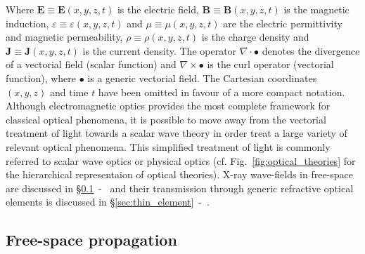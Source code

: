 \begin{refsection}
Where $\textbf{E}\equiv\textbf{E}(x,y,z,t)$ is the electric field, $\textbf{B}\equiv\textbf{B}(x,y,z,t)$ is the magnetic induction, $\varepsilon\equiv\varepsilon(x,y,z,t)$ and $\mu\equiv\mu(x,y,z,t)$ are the electric permittivity and magnetic permeability, $\rho\equiv\rho(x,y,z,t)$ is the charge density and $\textbf{J}\equiv\textbf{J}(x,y,z,t)$ is the current density. The operator $\nabla\cdot\bullet$ denotes the divergence of a vectorial field (scalar function) and $\nabla\times\bullet$ is the curl operator (vectorial function), where $\bullet$ is a generic vectorial field. The Cartesian coordinates $(x,y,z)$ and time $t$ have been omitted in favour of a more compact notation. Although electromagnetic optics provides the most complete framework for classical optical phenomena, it is possible to move away from the vectorial treatment of light towards a scalar wave theory in order treat a large variety of relevant optical phenomena. This simplified treatment of light is commonly referred to scalar wave optics or physical optics (cf. Fig.~\ref{fig:optical_theories} for the hierarchical representaion of optical theories). X-ray wave-fields in free-space are discussed in §\ref{sec:free-space}~-~\textit{} and their transmission through generic refractive optical elements is discussed in §\ref{sec:thin_element}~-~\textit{}.

\subsection{Free-space propagation}\label{sec:free-space}


\end{refsection}

